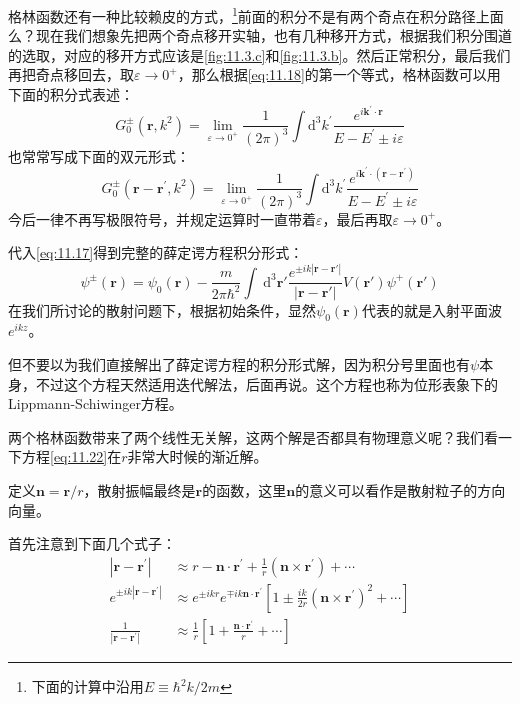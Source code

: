 \documentclass[a4paper,zihao=-4,linespread=1]{ctexrep}
\begin{document}
	格林函数还有一种比较赖皮的方式，\footnote{下面的计算中沿用$E\equiv \hbar^2k/2m$}前面的积分不是有两个奇点在积分路径上面么？现在我们想象先把两个奇点移开实轴，也有几种移开方式，根据我们积分围道的选取，对应的移开方式应该是\ref{fig:11.3.c}和\ref{fig:11.3.b}。然后正常积分，最后我们再把奇点移回去，取$\varepsilon\to 0^+$，那么根据\ref{eq:11.18}的第一个等式，格林函数可以用下面的积分式表述：
	\begin{equation}
		\boxed{
			G^{\pm}_0\left(\mathbf{r},k^2\right)=\lim_{\varepsilon\to 0^+}\frac{1}{(2\pi)^3}\int \mathrm{d}^3k^\prime \frac{e^{i\mathbf{k}^\prime\cdot\mathbf{r}}}{E-E^\prime\pm i\varepsilon}
		}
	\end{equation}
	也常常写成下面的双元形式：
	\begin{equation}
		\label{eq:11.21}
		\boxed{
		G^{\pm}_0\left(\mathbf{r}-\mathbf{r}^\prime,k^2\right)=\lim_{\varepsilon\to 0^+}\frac{1}{(2\pi)^3}\int \mathrm{d}^3k^\prime \frac{e^{i\mathbf{k}^\prime\cdot\left(\mathbf{r}-\mathbf{r}^\prime\right)}}{E-E^\prime\pm i\varepsilon}
	}
	\end{equation}
	今后一律不再写极限符号，并规定运算时一直带着$\varepsilon$，最后再取$\varepsilon\to 0^+$。
	
	代入\ref{eq:11.17}得到完整的薛定谔方程积分形式：
	\begin{equation}
		\label{eq:11.22}
		\boxed{\psi^{\pm}(\mathbf{r})={\psi _0}({\mathbf{r}}) - \frac{m}{{2\pi {\hbar ^2}}}\int {\mathrm{~d}^3} {\mathbf{r'}}\frac{{{e^{ \pm ik|{\mathbf{r}} - {\mathbf{r'}}|}}}}{{|{\mathbf{r}} - {\mathbf{r'}}|}}V({\mathbf{r'}}){\psi ^ + }({\mathbf{r'}})}
	\end{equation}
	在我们所讨论的散射问题下，根据初始条件，显然$\psi_0(\mathbf{r})$代表的就是入射平面波$e^{ikz}$。

	但不要以为我们直接解出了薛定谔方程的积分形式解，因为积分号里面也有$\psi$本身，不过这个方程天然适用迭代解法，后面再说。这个方程也称为位形表象下的Lippmann-Schiwinger方程。
	
	两个格林函数带来了两个线性无关解，这两个解是否都具有物理意义呢？我们看一下方程\ref{eq:11.22}在$r$非常大时候的渐近解。
	
	定义$\mathbf{n}=\mathbf{r}/r$，散射振幅最终是$\mathbf{r}$的函数，这里$\mathbf{n}$的意义可以看作是散射粒子的方向向量。
	
	首先注意到下面几个式子：
	\begin{equation}
		\begin{aligned}
			|\mathbf{r}-\mathbf{r}^\prime|&\approx r-\mathbf{n}\cdot\mathbf{r}^\prime+\frac{1}{r}(\mathbf{n}\times\mathbf{r}^\prime)+\cdots\\
			e^{\pm ik|\mathbf{r}-\mathbf{r}^\prime|}&\approx e^{\pm ikr}e^{\mp ik \mathbf{n}\cdot\mathbf{r}^\prime}\left[1\pm\frac{ik}{2r}(\mathbf{n}\times\mathbf{r}^\prime)^2+\cdots\right]\\
			\frac{1}{|\mathbf{r}-\mathbf{r}^\prime|}&\approx\frac{1}{r}\left[1+\frac{\mathbf{n}\cdot\mathbf{r^\prime}}{r}+\cdots\right]
		\end{aligned}
	\end{equation}
\end{document}
